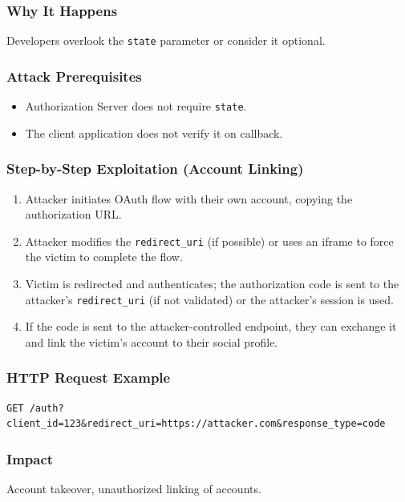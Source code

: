 \documentclass[12pt,a4paper]{article}
\begin{document}
\subsubsection{Why It Happens}
Developers overlook the \texttt{state} parameter or consider it optional.

\subsubsection{Attack Prerequisites}
\begin{itemize}
    \item Authorization Server does not require \texttt{state}.
    \item The client application does not verify it on callback.
\end{itemize}

\subsubsection{Step-by-Step Exploitation (Account Linking)}
\begin{enumerate}
    \item Attacker initiates OAuth flow with their own account, copying the authorization URL.
    \item Attacker modifies the \texttt{redirect\_uri} (if possible) or uses an iframe to force the victim to complete the flow.
    \item Victim is redirected and authenticates; the authorization code is sent to the attacker's \texttt{redirect\_uri} (if not validated) or the attacker's session is used.
    \item If the code is sent to the attacker-controlled endpoint, they can exchange it and link the victim's account to their social profile.
\end{enumerate}

\subsubsection{HTTP Request Example}
\begin{lstlisting}
GET /auth?client_id=123&redirect_uri=https://attacker.com&response_type=code
\end{lstlisting}


\subsubsection{Impact}
Account takeover, unauthorized linking of accounts.
\end{document}
